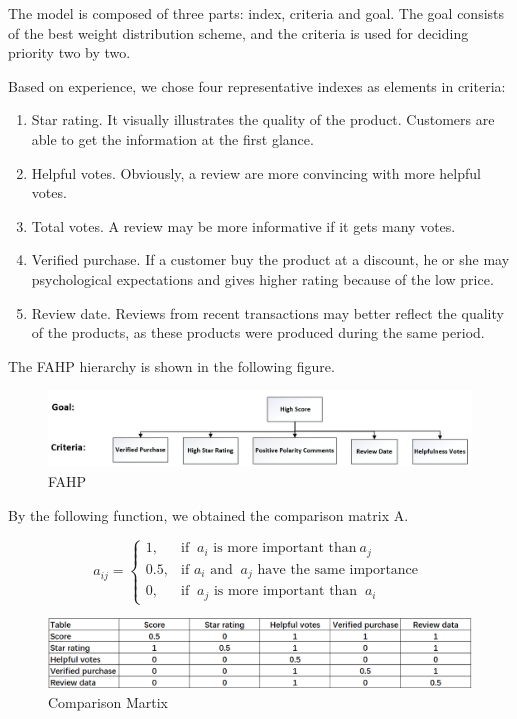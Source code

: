 \documentclass[12pt]{article}  %
\begin{document}
The model is composed of three parts: index, criteria and goal. The goal consists of the best weight distribution scheme, and the criteria is used for deciding priority two by two.


Based on experience,  we chose four representative indexes as elements in criteria: 
\begin{enumerate}[\bfseries 1.]
    \item Star rating. It visually illustrates the quality of the product. Customers are able to get the information at the first glance. 
    \item Helpful votes. Obviously, a review are  more convincing with more helpful votes.
    \item Total votes. A review may be more informative if it gets many votes.
    \item Verified purchase. If a customer buy the product at a discount, he or she may psychological expectations and gives higher rating because of the low price. 
    \item Review date. Reviews from recent transactions may better reflect the quality of the products, as these products were produced during the same period.
\end{enumerate}


The FAHP hierarchy is shown in the following figure.

\begin{figure}[!htbp]
\centering
\includegraphics[width=.6\textwidth]{e.PNG}
\caption{FAHP}\label{fig:FAHP}
\end{figure}

By the following function, we obtained the comparison matrix A.

\begin{equation}\label{eq:1}
a_{ij} = \begin{cases}
        1,   &\text{if }\ a_i \text{ is more important than}\ a_j  \\
        0.5, &\text{if } a_i \text{ and }\ a_j \text{ have the same importance}\  \\
        0,  &\text{if }\ a_j \text{ is more important than }\ a_i
        \end{cases}
\end{equation}


\begin{figure}[!htbp]
\centering
\includegraphics[width=.6\textwidth]{z.png}
\caption{Comparison Martix}\label{fig:Comparison Matrix}
\end{figure}
\end{document}
